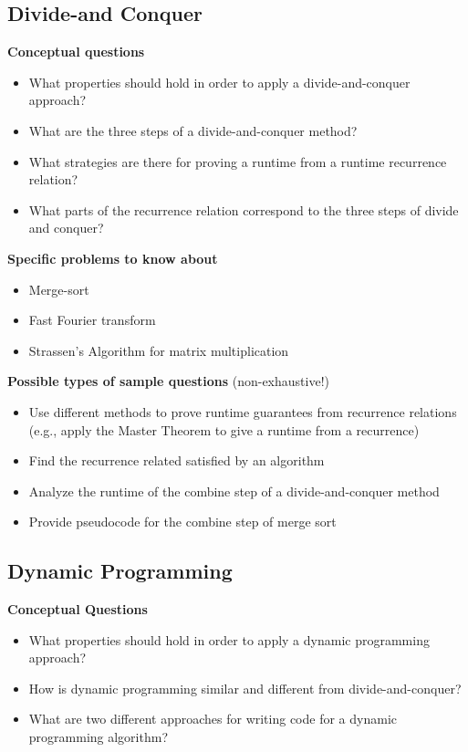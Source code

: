 \documentclass[11  pt]{exam}
\begin{document}
	\subsection{Divide-and Conquer}
	
	\textbf{Conceptual questions}
	\begin{itemize}
		\item What properties should hold in order to apply a divide-and-conquer approach?
		\item What are the three steps of a divide-and-conquer method? 
		\item What strategies are there for proving a runtime from a runtime recurrence relation?
		\item What parts of the recurrence relation correspond to the three steps of divide and conquer?
	\end{itemize}
	
	\textbf{Specific problems to know about}
	\begin{itemize}
		\item Merge-sort
		\item Fast Fourier transform
		\item Strassen's Algorithm for matrix multiplication
	\end{itemize}
	
	\textbf{Possible types of sample questions} (non-exhaustive!)
	\begin{itemize}
		\item Use different methods to prove runtime guarantees from recurrence relations (e.g., apply the Master Theorem to give a runtime from a recurrence)
		\item Find the recurrence related satisfied by an algorithm
		\item Analyze the runtime of the combine step of a divide-and-conquer method
		\item Provide pseudocode for the combine step of merge sort
	\end{itemize}
	
	\subsection{Dynamic Programming}
	\textbf{Conceptual Questions}
	\begin{itemize}
		\item What properties should hold in order to apply a dynamic programming approach?
		\item How is dynamic programming similar and different from divide-and-conquer?
		\item What are two different approaches for writing code for a dynamic programming algorithm?
	\end{itemize}
	
\end{document}
